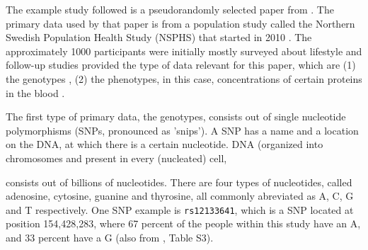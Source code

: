 The example study followed is a pseudorandomly selected paper
from \cite{ahsan2017relative}. The primary data used by that paper is
from a population study called the Northern Swedish Population
Health Study (NSPHS) that started in 2010 \cite{igl2010northern}. 
The approximately 1000 participants were initially mostly surveyed
about lifestyle \cite{igl2010northern} and follow-up studies
provided the type of data relevant for this paper, 
which are (1) the genotypes \cite{johansson2013identification},
(2) the phenotypes, in this case, concentrations of certain proteins in the blood \cite{enroth2014strong,enroth2015effect}.

The first type of primary data, the genotypes, 
consists out of single nucleotide polymorphisms (SNPs, pronounced as 'snips').
A SNP has a name and a location on the DNA, at which there is a certain nucleotide.
DNA (organized into chromosomes and present in every (nucleated) cell, 

consists out of billions of nucleotides.
There are four types of nucleotides, 
called adenosine, cytosine, guanine and thyrosine, all commonly abreviated
as A, C, G and T respectively.
One SNP example is \verb|rs12133641|, which is a SNP located at position 
154,428,283, where 67 percent of the people within this study have an A,
and 33 percent have a G (also from \cite{ahsan2017relative}, Table S3).

